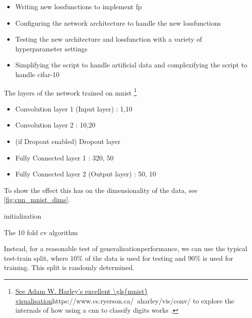 \begin{itemize}
    \itemsep-1em 
    \item Writing new \gls{lossfunction}s to implement \gls{fp}
    \item Configuring the network architecture to handle the new \gls{lossfunction}s
    \item Testing the new architecture and \gls{lossfunction} with a variety of \gls{hyperparameter} settings
    \item Simplifying the script to handle artificial data and complexifying the script to handle \gls{cifar}-10
\end{itemize}

The layers of the network trained on \gls{mnist} \footnote{\url{See Adam W. Harley's excellent \gls{mnist} visualisation}{https://www.cs.ryerson.ca/~aharley/vis/conv/} to explore the internals of how using a \gls{cnn} to classify digits works \cite{mnist_viz}.}

\begin{itemize}
    \itemsep-1em 
    \item Convolution layer 1 (Input layer) : 1,10
    \item Convolution layer 2 : 10,20
    \item (if Dropout enabled) Dropout layer 
    \item Fully Connected layer 1 : 320, 50
    \item Fully Connected layer 2 (Output layer) : 50, 10
\end{itemize}

To show the effect this has on the dimensionality of the data, see \ref{fig:cnn_mnist_dims}. 


\bigskip

\begin{algorithm}[H]
\SetAlgoLined
{}
 initialization\;
    \caption{The 10 fold \gls{cv} algorithm}
    \label{algo:10-fold-cv}
\end{algorithm}


\bigskip

Instead, for a reasonable test of \gls{generalisationperformance}, we can use the typical test-train split, where 10\% of the data is used for testing and 90\% is used for training. This split is randomly determined.
\bigskip

